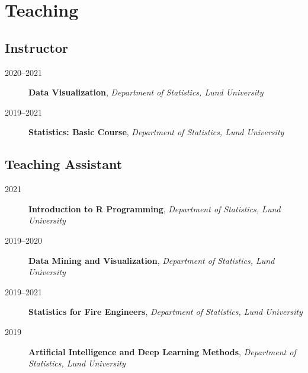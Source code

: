 \documentclass[
  10pt,
  headsepline=true,
  english,
  DIV=12
]{scrartcl}
\renewcommand*{%
  \mkbibnamegiven
}[1]{\ifitemannotation{highlight}{\textbf{#1}}{#1}}
\renewcommand*{%
  \mkbibnamefamily
}[1]{\ifitemannotation{highlight}{\textbf{#1}}{#1}}
\begin{document}
\section{Teaching}

\subsection{Instructor}

\begin{description}
  \item[2020--2021]{
              \textbf{Data Visualization}, \emph{Department of Statistics, Lund
                University}
        }
  \item[2019--2021]{
              \textbf{Statistics: Basic Course}, \emph{Department of Statistics, Lund
                University}

        }
\end{description}

\subsection{Teaching Assistant}

\begin{description}

  \item[2021]{
              \textbf{Introduction to R Programming}, \emph{Department of Statistics,
                Lund University}
        }

  \item[2019--2020]{
              \textbf{Data Mining and Visualization}, \emph{Department of Statistics,
                Lund University}

        }

  \item[2019--2021]{
              \textbf{Statistics for Fire Engineers},
              \emph{Department of Statistics, Lund University}
        }

  \item[2019]{
              \textbf{Artificial Intelligence and Deep Learning Methods},
              \emph{Department of Statistics, Lund University}

        }

\end{description}
\end{document}
